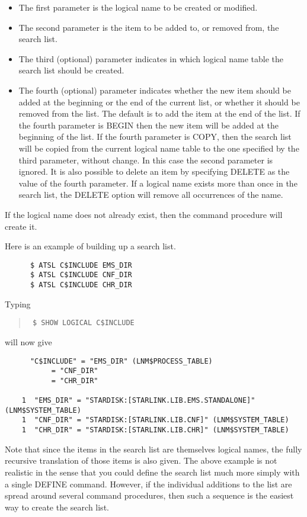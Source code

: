 \begin{itemize}
\item The first parameter is the logical name to be created or modified. 
\item The second parameter is the item to be added to, or removed from, the
search list. 
\item The third (optional) parameter indicates in which logical name table the
search list should be created.
\item The fourth (optional) parameter indicates whether the new item should be
added at the beginning or the end of the current list, or whether it should be
removed from the list. The default is to add the item at the end of the list.
If the fourth parameter is BEGIN then the new item will be added at the
beginning of the list. If the fourth parameter is COPY, then the search list
will be copied from the current logical name table to the one specified by the
third parameter, without change. In this case the second parameter is ignored.
It is also possible to delete an item by specifying DELETE as the value of the
fourth parameter. If a logical name exists more than once in the search list,
the DELETE option will remove all occurrences of the name.
\end{itemize}

If the logical name does not already exist, then the command procedure will
create it.

Here is an example of building up a search list.

\begin{verbatim}
      $ ATSL C$INCLUDE EMS_DIR
      $ ATSL C$INCLUDE CNF_DIR
      $ ATSL C$INCLUDE CHR_DIR
\end{verbatim}

Typing

\begin{quote}{\tt 
\$ SHOW LOGICAL C\$INCLUDE
}
\end{quote}

will now give 

\begin{verbatim}
      "C$INCLUDE" = "EMS_DIR" (LNM$PROCESS_TABLE)
           = "CNF_DIR"
           = "CHR_DIR"

    1  "EMS_DIR" = "STARDISK:[STARLINK.LIB.EMS.STANDALONE]" (LNM$SYSTEM_TABLE)
    1  "CNF_DIR" = "STARDISK:[STARLINK.LIB.CNF]" (LNM$SYSTEM_TABLE)
    1  "CHR_DIR" = "STARDISK:[STARLINK.LIB.CHR]" (LNM$SYSTEM_TABLE)
\end{verbatim}

Note that since the items in the search list are themselves logical names, the
fully recursive translation of those items is also given. The above example is
not realistic in the sense that you could define the search list much more
simply with a single DEFINE command. However, if the individual additions to
the list are spread around several command procedures, then such a sequence is
the easiest way to create the search list.

